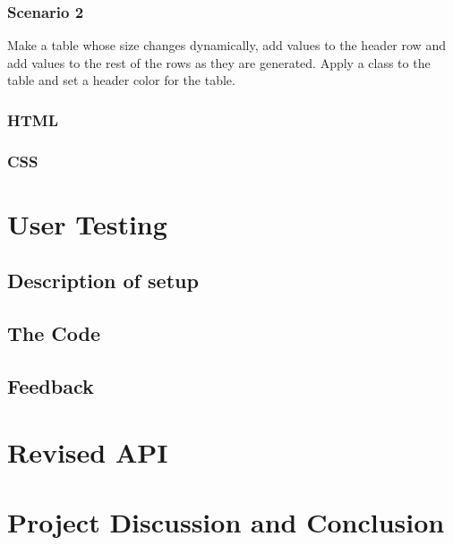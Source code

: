 \documentclass[12pt]{article}
\begin{document}
\subsubsection{Scenario 2}
Make a table whose size changes dynamically, add values to the header row and add values to the rest of the rows as they are generated. Apply a class to the table and set a header color for the table.

\subsubsection{HTML}

\subsubsection{CSS}

\section{User Testing}

\subsection{Description of setup}

\subsection{The Code}

\subsection{Feedback}

\section{Revised API}

\section{Project Discussion and Conclusion}
\end{document}
